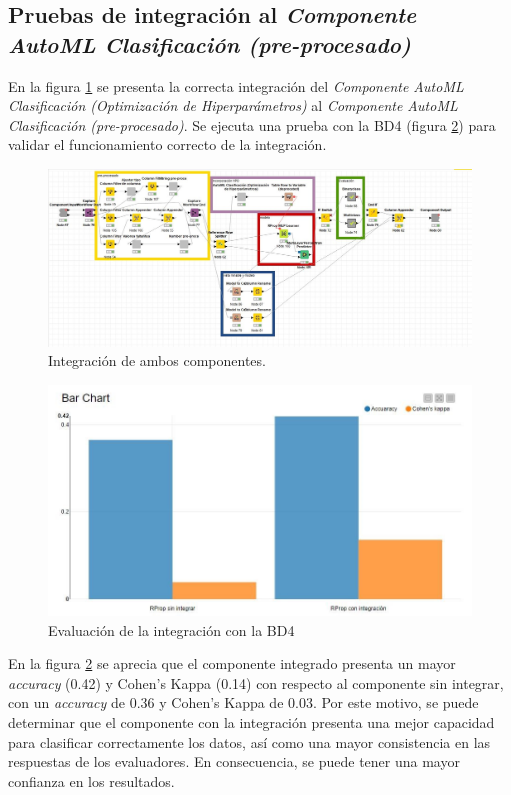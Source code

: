 \subsection{Pruebas de integración al \textit{Componente AutoML Clasificación (pre-procesado)}}
En la figura \ref{fig:integracion-comp-hpo} se presenta la correcta integración del \textit{Componente AutoML Clasificación (Optimización de Hiperparámetros)} al \textit{Componente AutoML Clasificación (pre-procesado)}. Se ejecuta una prueba con la BD4 (figura \ref{fig:eval-integ-bd2}) para validar el funcionamiento correcto de la integración.

\begin{figure}[H]
	\centering
	\includegraphics[width=0.7\linewidth]{"figuras/capi 3/integracion-comp-hpo"}
	\caption{Integración de ambos componentes.}
	\label{fig:integracion-comp-hpo}
\end{figure}

\begin{figure}[H]
	\centering
	\includegraphics[width=0.7\linewidth]{"figuras/capi 3/pruebas-ray/eval-integ-bd2"}
	\caption{Evaluación de la integración con la BD4}
	\label{fig:eval-integ-bd2}
\end{figure}

En la figura \ref{fig:eval-integ-bd2} se aprecia que el componente integrado presenta un mayor \textit{accuracy} (0.42) y Cohen’s Kappa (0.14) con respecto al componente sin integrar, con un \textit{accuracy} de 0.36 y Cohen’s Kappa de 0.03. Por este motivo, se puede determinar que el componente con la integración presenta una mejor capacidad para clasificar correctamente los datos, así como una mayor consistencia en las respuestas de los evaluadores. En consecuencia, se puede tener una mayor confianza en los resultados.



